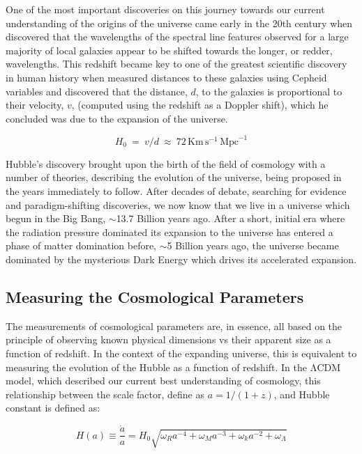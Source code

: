 One of the most important discoveries on this journey towards our current understanding of the origins of the universe came early in the 20th century when \citep{Slipher1915} discovered that the wavelengths of the spectral line features observed for a large majority of local galaxies appear to be shifted towards the longer, or redder, wavelengths. This redshift became key to one of the greatest scientific discovery in human history when \citep{Hubble1929} measured distances to these galaxies using Cepheid variables and discovered that the distance, $d$, to the galaxies is proportional to their velocity, $v$, (computed using the redshift as a Doppler shift), which he concluded was due to the expansion of the universe.

\begin{equation}
H_0~=~v/d~\approx~72\,\mathrm{Km}\,\mathrm{s}^{-1}\,\mathrm{Mpc}^{-1}
\end{equation}

Hubble's discovery brought upon the birth of the field of cosmology with a number of theories, describing the evolution of the universe, being proposed in the years immediately to follow. After decades of debate, searching for evidence and paradigm-shifting discoveries, we now \citep{Adam2016} know that we live in a universe which begun in the Big Bang, $\sim$13.7 Billion years ago. After a short, initial era where the radiation pressure dominated its expansion to the universe has entered a phase of matter domination before, $\sim$5 Billion years ago, the universe became dominated by the mysterious Dark Energy which drives its accelerated expansion.

\subsection{Measuring the Cosmological Parameters}
The measurements of cosmological parameters are, in essence, all based on the principle of observing known physical dimensions vs their apparent size as a function of redshift. In the context of the expanding universe, this is equivalent to measuring the evolution of the Hubble  as a function of redshift. In the $\mathrm{\Lambda}$CDM model, which described our current best understanding of cosmology, this relationship between the scale factor, define as $a = 1 / (1 + z)$, and Hubble constant is defined as:

\begin{equation} \label{eq:ScaleFactor}
  H(a) \equiv \frac{\dot{a}}{a} = H_0 \sqrt{\omega_{R}a^{-4} + \omega_{M}a^{-3} + \omega_{k}a^{-2} + \omega_{\Lambda}}
\end{equation}

